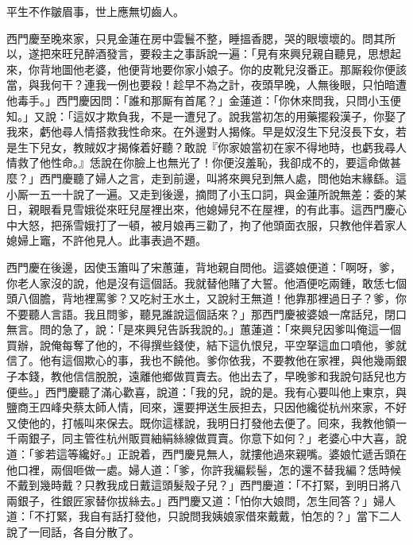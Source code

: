平生不作皺眉事，世上應無切齒人。

西門慶至晚來家，只見金蓮在房中雲鬟不整，睡搵香腮，哭的眼壞壞的。{}問其所以，遂把來旺兒醉酒發言，要殺主之事訴說一遍：「見有來興兒親自聽見，思想起來，你背地圖他老婆，他便背地要你家小娘子。你的皮靴兒沒番正。那厮殺你便該當，與我何干？連我一例也要殺！趁早不為之計，夜頭早晚，人無後眼，只怕暗遭他毒手。」西門慶因問：「誰和那厮有首尾？」金蓮道：「你休來問我，只問小玉便知。」又說：「這奴才欺負我，不是一遭兒了。說我當初怎的用藥擺殺漢子，你娶了我來，虧他尋人情搭救我性命來。在外邊對人揭條。早是奴沒生下兒沒長下女，若是生下兒女，教賊奴才揭條着好聽？{}敢說『你家娘當初在家不得地時，也虧我尋人情救了他性命。』恁說在你臉上也無光了！你便沒羞恥，我卻成不的，要這命做甚麼？」西門慶聽了婦人之言，走到前邊，叫將來興兒到無人處，問他始末緣繇。這小厮一五一十說了一遍。又走到後邊，摘問了小玉口詞，與金蓮所說無差：委的某日，親眼看見雪娥從來旺兒屋裡出來，他媳婦兒不在屋裡，的有此事。這西門慶心中大怒，把孫雪娥打了一頓，被月娘再三勸了，拘了他頭面衣服，只教他伴着家人媳婦上竈，不許他見人。此事表過不題。

西門慶在後邊，因使玉簫叫了宋蕙蓮，背地親自問他。{}這婆娘便道：「啊呀，爹，你老人家沒的說，他是沒有這個話。我就替他賭了大誓。他酒便吃兩鍾，敢恁七個頭八個膽，背地裡罵爹？又吃紂王水土，又說紂王無道！他靠那裡過日子？爹，你不要聽人言語。我且問爹，聽見誰說這個話來？」{}那西門慶被婆娘一席話兒，閉口無言。問的急了，說：「是來興兒告訴我說的。」蕙蓮道：「來興兒因爹叫俺這一個買辦，說俺每奪了他的，不得撰些錢使，結下這仇恨兒，平空拏這血口噴他，爹就信了。他有這個欺心的事，我也不饒他。爹你依我，不要教他在家裡，與他幾兩銀子本錢，教他信信脫脫，遠離他鄉做買賣去。{}他出去了，早晚爹和我說句話兒也方便些。」西門慶聽了滿心歡喜，說道：「我的兒，說的是。我有心要叫他上東京，與鹽商王四峰央蔡太師人情，囘來，還要押送生辰担去，只因他纔從杭州來家，不好又使他的，打帳叫來保去。既你這樣說，我明日打發他去便了。囘來，我教他領一千兩銀子，同主管徃杭州販買紬絹絲線做買賣。你意下如何？」老婆心中大喜，說道：「爹若這等纔好。」正說着，西門慶見無人，就摟他過來親嘴。婆娘忙遞舌頭在他口裡，兩個咂做一處。婦人道：「爹，你許我編鬏髻，怎的還不替我編？{}恁時候不戴到幾時戴？只教我成日戴這頭髮殼子兒？」西門慶道：「不打緊，到明日將八兩銀子，徃銀匠家替你拔絲去。」西門慶又道：「怕你大娘問，怎生囘答？」婦人道：「不打緊，我自有話打發他，只說問我姨娘家借來戴戴，怕怎的？」當下二人說了一囘話，各自分散了。

